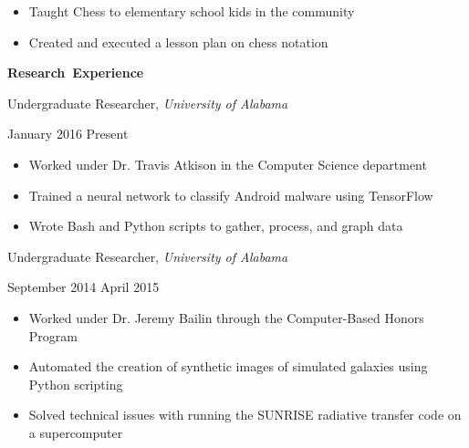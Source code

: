 \documentclass[11pt]{article}
\begin{document}
\begin{itemize}
  \item Taught Chess to elementary school kids in the community
  \item Created and executed a lesson plan on chess notation
\end{itemize}

\vspace{0.8em}
\hbox{\large \textbf{Research Experience}}

\vspace{0.4em}
\begin{minipage}[t]{0.65\textwidth}
\flushleft
Undergraduate Researcher, \textit{University of Alabama}\\
\end{minipage}
\begin{minipage}[t]{0.30\textwidth}
\flushright
January 2016 \space \textemdash \space Present\\
\end{minipage}

\begin{itemize}
  \item Worked under Dr. Travis Atkison in the Computer Science department
  \item Trained a neural network to classify Android malware using TensorFlow
  \item Wrote Bash and Python scripts to gather, process, and graph data
\end{itemize}

\vspace{0.4em}
\begin{minipage}[t]{0.65\textwidth}
\flushleft
Undergraduate Researcher, \textit{University of Alabama}\\
\end{minipage}
\begin{minipage}[t]{0.30\textwidth}
\flushright
September 2014 \space \textemdash \space April 2015\\
\end{minipage}

\begin{itemize}
  \item Worked under Dr. Jeremy Bailin through the Computer-Based Honors Program
  \item Automated the creation of synthetic images of simulated galaxies using Python scripting
  \item Solved technical issues with running the SUNRISE radiative transfer code on a supercomputer
\end{itemize}
\end{document}
